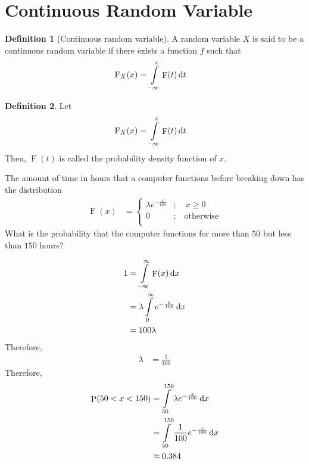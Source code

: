 \documentclass[titlepage, fleqn, a4paper, 12pt, twoside]{article}
\theoremstyle{definition}
\newtheorem{definition}{Definition}
\theoremstyle{theorem}
\DeclareMathOperator{\prob}{\mathrm{P}}
\DeclareMathOperator{\pdf}{\mathrm{F}}
\newcommand*{\cdf}[1]{\mathrm{F}_{#1}}
\begin{document}
\section{Continuous Random Variable}

\begin{definition}[Continuous random variable]
	A random variable $X$ is said to be a continuous random variable if there exists a function $f$ such that
	\begin{align*}
		\cdf{X}(x) & = \int\limits_{-\infty}^{x} \pdf(t) \dif t
	\end{align*}
\end{definition}

\begin{definition}
	Let
	\begin{align*}
		\cdf{X}(x) & = \int\limits_{-\infty}^{x} \pdf(t) \dif t
	\end{align*}
	Then, $\pdf(t)$ is called the probability density function of $x$.
\end{definition}

\begin{question}
	The amount of time in hours that a computer functions before breaking down has the distribution
	\begin{align*}
		\pdf(x) &=
			\begin{cases}
				\lambda e^{-\frac{x}{100}} & ;\quad x \ge 0          \\
				0                          & ;\quad \text{otherwise} \\
			\end{cases}
	\end{align*}
	What is the probability that the computer functions for more than $50$ but less than $150$ hours?
\end{question}

\begin{solution}
	\begin{align*}
		1 & = \int\limits_{-\infty}^{\infty} \pdf(x) \dif x              \\
                  & = \lambda \int\limits_{0}^{\infty} e^{-\frac{x}{100}} \dif x \\
                  & = 100 \lambda
	\end{align*}
	Therefore,
	\begin{align*}
		\lambda & = \frac{1}{100}
	\end{align*}
	Therefore,
	\begin{align*}
		\prob(50 < x < 150) & = \int\limits_{50}^{150} \lambda e^{-\frac{x}{100}} \dif x       \\
                                    & = \int\limits_{50}^{150} \frac{1}{100} e^{-\frac{x}{100}} \dif x \\
                                    & \approx 0.384
	\end{align*}
\end{solution}
\end{document}
